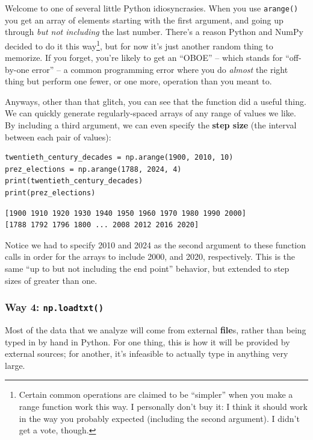 Welcome to one of several little Python idiosyncrasies. When you use
\texttt{arange()} you get an array of elements starting with the first
argument, and going up through \textit{but not including} the last number.
There's a reason Python and NumPy decided to do it this way\footnote{Certain
common operations are claimed to be ``simpler'' when you make a range function
work this way. I personally don't buy it: I think it should work in the way you
probably expected (including the second argument). I didn't get a vote,
though.}, but for now it's just another random thing to memorize. If you
forget, you're likely to get an ``OBOE'' -- which stands for ``off-by-one
error'' -- a common programming error where you do \textit{almost} the right
thing but perform one fewer, or one more, operation than you meant to.

Anyways, other than that glitch, you can see that the function did a useful
thing. We can quickly generate regularly-spaced arrays of any range of values
we like. By including a third argument, we can even specify the \textbf{step
size} (the interval between each pair of values):

\begin{Verbatim}[fontsize=\small,samepage=true,frame=single,framesep=3mm]
twentieth_century_decades = np.arange(1900, 2010, 10)
prez_elections = np.arange(1788, 2024, 4)
print(twentieth_century_decades)
print(prez_elections)
\end{Verbatim}

\begin{Verbatim}[fontsize=\small,samepage=true,frame=leftline,framesep=5mm,framerule=1mm]
[1900 1910 1920 1930 1940 1950 1960 1970 1980 1990 2000]
[1788 1792 1796 1800 ... 2008 2012 2016 2020]
\end{Verbatim}

Notice we had to specify 2010 and 2024 as the second argument to these function
calls in order for the arrays to include 2000, and 2020, respectively. This is
the same ``up to but not including the end point'' behavior, but extended to
step sizes of greater than one.

\subsubsection{Way 4: \texttt{np.loadtxt()}}


Most of the data that we analyze will come from external \textbf{file}s, rather
than being typed in by hand in Python. For one thing, this is how it will be
provided by external sources; for another, it's infeasible to actually type in
anything very large.

